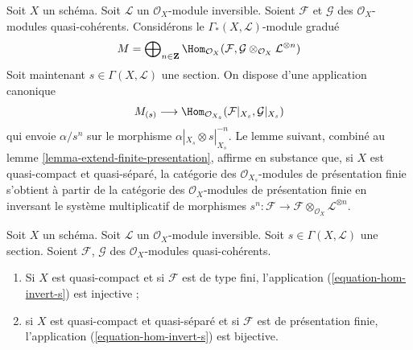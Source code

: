 \noindent
Soit $X$ un schéma. Soit $\mathcal{L}$ un $\mathcal{O}_X$-module inversible.
Soient $\mathcal{F}$ et $\mathcal{G}$ des $\mathcal{O}_X$-modules
quasi-cohérents. Considérons le $\Gamma_*(X, \mathcal{L})$-module gradué
$$
M = \bigoplus\nolimits_{n \in \mathbf{Z}} \Hom_{\mathcal{O}_X}(\mathcal{F},
\mathcal{G} \otimes_{\mathcal{O}_X} \mathcal{L}^{\otimes n})
$$
Soit maintenant $s \in \Gamma(X, \mathcal{L})$ une section. On dispose d'une
application canonique
\begin{equation}
\label{equation-hom-invert-s}
M_{(s)} \longrightarrow
\Hom_{\mathcal{O}_{X_s}}(\mathcal{F}|_{X_s}, \mathcal{G}|_{X_s})
\end{equation}
qui envoie $\alpha/s^n$ sur le morphisme $\alpha|_{X_s} \otimes s|_{X_s}^{-n}$.
Le lemme suivant, combiné au
lemme \ref{lemma-extend-finite-presentation},
affirme en substance que, si $X$ est quasi-compact et
quasi-séparé, la catégorie des $\mathcal{O}_{X_s}$-modules de
présentation finie s'obtient à partir de la catégorie des $\mathcal{O}_X$-modules de
présentation finie en inversant le système multiplicatif de morphismes
$s^n: \mathcal{F} \to
\mathcal{F} \otimes_{\mathcal{O}_X} \mathcal{L}^{\otimes n}$.

\begin{lemma}
\label{lemma-section-maps-backwards}
Soit $X$ un schéma. Soit $\mathcal{L}$ un $\mathcal{O}_X$-module
inversible. Soit $s \in \Gamma(X, \mathcal{L})$ une section.
Soient $\mathcal{F}$, $\mathcal{G}$ des $\mathcal{O}_X$-modules quasi-cohérents.
\begin{enumerate}
\item Si $X$ est quasi-compact et si $\mathcal{F}$ est de type fini,
l'application (\ref{equation-hom-invert-s}) est injective ;
\item si $X$ est quasi-compact et quasi-séparé et si $\mathcal{F}$
est de présentation finie, l'application
(\ref{equation-hom-invert-s})
est bijective.
\end{enumerate}
\end{lemma}

